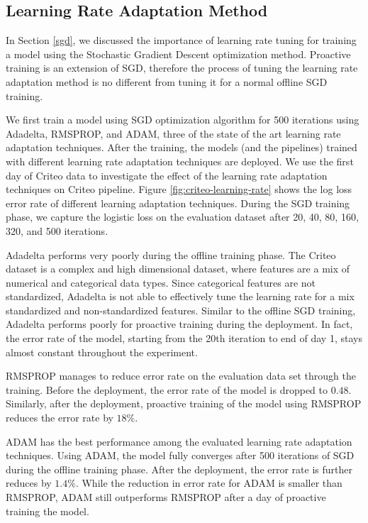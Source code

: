 \subsection{Learning Rate Adaptation Method}
In Section \ref{sgd}, we discussed the importance of learning rate tuning for training a model using the Stochastic Gradient Descent optimization method.
Proactive training is an extension of SGD, therefore the process of tuning the learning rate adaptation method is no different from tuning it for a normal offline SGD training.

We first train a model using SGD optimization algorithm for 500 iterations using Adadelta, RMSPROP, and ADAM, three of the state of the art learning rate adaptation techniques.
After the training, the models (and the pipelines) trained with different learning rate adaptation techniques are deployed.
We use the first day of Criteo data to investigate the effect of the learning rate adaptation techniques on Criteo pipeline.
Figure \ref{fig:criteo-learning-rate} shows the log loss error rate of different learning adaptation techniques. 
During the SGD training phase, we capture the logistic loss on the evaluation dataset after 20, 40, 80, 160, 320, and 500 iterations.

Adadelta performs very poorly during the offline training phase.
The Criteo dataset is a complex and high dimensional dataset, where features are a mix of numerical and categorical data types.
Since categorical features are not standardized, Adadelta is not able to effectively tune the learning rate for a mix standardized and non-standardized features.
Similar to the offline SGD training, Adadelta performs poorly for proactive training during the deployment.
In fact, the error rate of the model, starting from the 20th iteration to end of day 1, stays almost constant throughout the experiment.

RMSPROP manages to reduce error rate on the evaluation data set through the training.
Before the deployment, the error rate of the model is dropped to $0.48$.
Similarly, after the deployment, proactive training of the model using RMSPROP reduces the error rate by $18\%$.

ADAM has the best performance among the evaluated learning rate adaptation techniques.
Using ADAM, the model fully converges after 500 iterations of SGD during the offline training phase.
After the deployment, the error rate is further reduces by $1.4\%$.
While the reduction in error rate for ADAM is smaller than RMSPROP, ADAM still outperforms RMSPROP after a day of proactive training the model.


